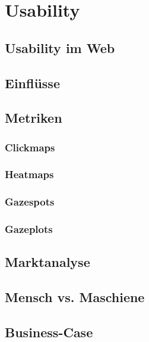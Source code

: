 
\chapter{Usability}
	\section{Usability im Web}
	\section{Einflüsse}
	\section{Metriken}
		\subsection{Clickmaps}
		\subsection{Heatmaps}
		\subsection{Gazespots}
		\subsection{Gazeplots}
	\section{Marktanalyse}
	\section{Mensch vs. Maschiene}
	\section{Business-Case}

